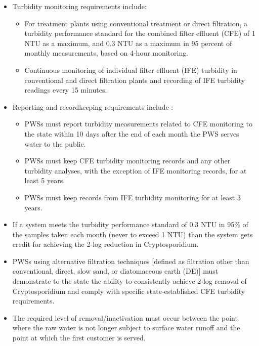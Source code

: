 \begin{itemize}
\item Turbidity monitoring requirements include:
\begin{itemize}
\item For treatment plants using conventional treatment or direct filtration, a turbidity performance standard for the combined filter effluent (CFE)  of 1 NTU as a maximum, and 0.3 NTU as a maximum in 95 percent of monthly measurements, based on 4-hour monitoring.
\item Continuous monitoring of individual filter effluent (IFE)  turbidity in conventional and direct filtration plants and recording of IFE turbidity readings every 15 minutes.
\end{itemize}
\item Reporting and recordkeeping requirements include :
\begin{itemize}
\item PWSs must report turbidity measurements related to CFE monitoring to the state within 10 days after the end of each month the PWS serves water to the public.

\item PWSs must keep CFE turbidity monitoring records and any other turbidity analyses, with the exception of IFE monitoring records, for at least 5 years. 

\item PWSs must keep records from IFE turbidity monitoring for at least 3 years.
\end{itemize}
\item If a system meets the turbidity performance standard of 0.3 NTU in 95\% of the samples taken each month (never to exceed 1 NTU) than the system gets credit for achieving the 2-log reduction in Cryptosporidium.

\item PWSs using alternative filtration techniques [defined as filtration other than conventional, direct, slow sand, or diatomaceous earth (DE)] must demonstrate to the state the ability to consistently achieve 2-log removal of Cryptosporidium and comply with specific state-established CFE turbidity requirements.


\item The required level of removal/inactivation must occur between the point where the raw water is not longer subject to surface water runoff and the point at which the first customer is served.


\end{itemize}
